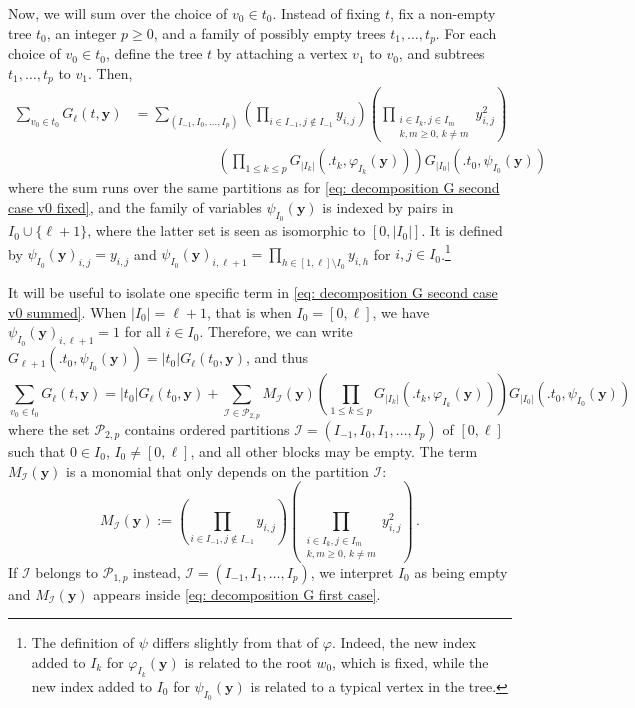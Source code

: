 \documentclass{article}
\theoremstyle{remark}
\newcommand{\abs}[1]{{\left|#1\right|}}
\newcommand{\cI}{\mathcal{I}}
\newcommand{\cP}{\mathcal{P}}
\newcommand{\by}{{\mathbf{y}}}
\begin{document}
Now, we will sum over the choice of $v_0\in t_0$.
Instead of fixing $t$, fix a non-empty tree $t_0$, an integer $p\ge0$, and a family of possibly empty trees $t_1, \dots, t_p$.
For each choice of $v_0\in t_0$, define the tree $t$ by attaching a vertex $v_1$ to $v_0$, and subtrees $t_1, \dots, t_p$ to $v_1$.
Then,
\begin{align}\label{eq: decomposition G second case v0 summed}
    \sum_{v_0\in t_0} G_\ell (t,\by) &= \sum_{(I_{-1}, I_0, \dots, I_p)} 
    \left( \prod_{i\in I_{-1}, j\notin I_{-1}} y_{i,j} \right)
    \left( \prod_{\substack{i\in I_k, j\in I_m \\ k,m\ge0,\,k \ne m}} y_{i,j}^2 \right) \nonumber \\ &\qquad \qquad \qquad
    \left( \prod_{1\le k\le p} G_{\abs{I_k}}\left(\big. t_k , \varphi_{I_k}(\by) \right) \right) G_{\abs{I_0}}\left(\big. t_0 , \psi_{I_0}(\by) \right)
\end{align}
where the sum runs over the same partitions as for \eqref{eq: decomposition G second case v0 fixed}, and the family of variables $\psi_{I_0}(\by)$ is indexed by pairs in $I_0 \cup \{\ell+1\}$, where the latter set is seen as isomorphic to $[0,\abs{I_0}]$.
It is defined by $\psi_{I_0}(\by)_{i,j} = y_{i,j}$ and $\psi_{I_0}(\by)_{i,\ell+1} = \prod_{h\in[1,\ell] \setminus I_0} y_{i,h}$ for $i,j\in I_0$.\footnote{
The definition of $\psi$ differs slightly from that of $\varphi$. 
Indeed, the new index added to $I_k$ for $\varphi_{I_k}(\by)$ is related to the root $w_0$, which is fixed, while the new index added to $I_0$ for $\psi_{I_0}(\by)$ is related to a typical vertex in the tree.
}

It will be useful to isolate one specific term in \eqref{eq: decomposition G second case v0 summed}.
When $\abs{I_0}=\ell+1$, that is when $I_0=[0,\ell]$, we have $\psi_{I_0}(\by)_{i,\ell+1} = 1$ for all $i\in I_0$.
Therefore, we can write $G_{\ell+1}\left(\big. t_0 , \psi_{I_0}(\by) \right) = \abs{t_0} G_\ell(t_0,\by)$, and thus
\begin{equation}\label{eq: decomposition G second case v0 summed, isolated term}
    \sum_{v_0\in t_0} G_\ell (t,\by) = \abs{t_0} G_\ell(t_0,\by)
    + \sum_{\cI \in \cP_{2,p}} 
    M_\cI(\by)
    \left( \prod_{1\le k\le p} G_{\abs{I_k}}\left(\big. t_k , \varphi_{I_k}(\by) \right) \right) G_{\abs{I_0}}\left(\big. t_0 , \psi_{I_0}(\by) \right)
\end{equation}
where the set $\cP_{2,p}$ contains ordered partitions $\cI = (I_{-1}, I_0, I_1, \dots, I_p)$ of $[0,\ell]$ such that $0\in I_0$, $I_0\ne [0,\ell]$, and all other blocks may be empty.
The term $M_\cI(\by)$ is a monomial that only depends on the partition $\cI$:
\begin{equation*}
    M_\cI(\by) := \left( \prod_{i\in I_{-1}, j\notin I_{-1}} y_{i,j} \right)
    \left( \prod_{\substack{i\in I_k, j\in I_m \\ k,m\ge0,\,k \ne m}} y_{i,j}^2 \right) \,.
\end{equation*}
If $\cI$ belongs to $\cP_{1,p}$ instead, $\cI = (I_{-1}, I_1, \dots, I_p)$, we interpret $I_0$ as being empty and $M_\cI(\by)$ appears inside \eqref{eq: decomposition G first case}.
\end{document}
